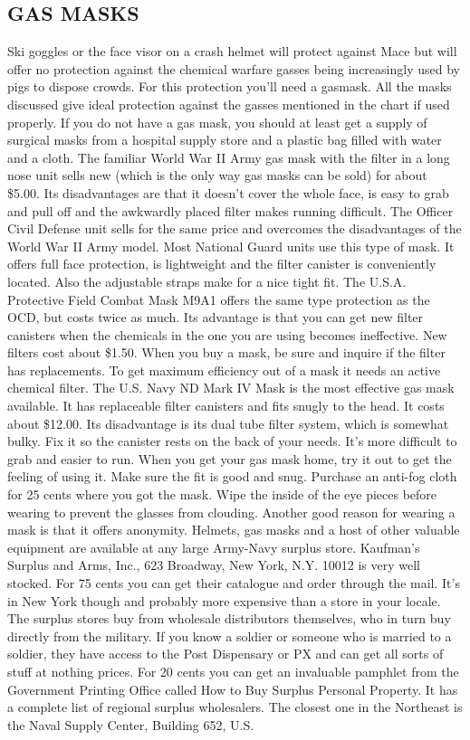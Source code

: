 \documentclass[11pt,twoside,a4paper]{book}
\begin{document}
\subsection{GAS MASKS}

Ski goggles or the face visor on a crash helmet will protect against Mace but will offer no protection against the chemical warfare gasses being increasingly used by pigs to dispose crowds. For this protection you'll need a gasmask. All the masks discussed give ideal protection against the gasses mentioned in the chart if used properly. If you do not have a gas mask, you should at least get a supply of surgical masks from a hospital supply store and a plastic bag filled with water and a cloth. The familiar World War II Army gas mask with the filter in a long nose unit sells new (which is the only way gas masks can be sold) for about \$5.00. Its disadvantages are that it doesn't cover the whole face, is easy to grab and pull off and the awkwardly placed filter makes running difficult. The Officer Civil Defense unit sells for the same price and overcomes the disadvantages of the World War II Army model. Most National Guard units use this type of mask. It offers full face protection, is lightweight and the filter canister is conveniently located. Also the adjustable straps make for a nice tight fit. The U.S.A. Protective Field Combat Mask M9A1 offers the same type protection as the OCD, but costs twice as much. Its advantage is that you can get new filter canisters when the chemicals in the one you are using becomes ineffective. New filters cost about \$1.50. When you buy a mask, be sure and inquire if the filter has replacements. To get maximum efficiency out of a mask it needs an active chemical filter. The U.S. Navy ND Mark IV Mask is the most effective gas mask available. It has replaceable filter canisters and fits snugly to the head. It costs about \$12.00. Its disadvantage is its dual tube filter system, which is somewhat bulky. Fix it so the canister rests on the back of your needs. It's more difficult to grab and easier to run. When you get your gas mask home, try it out to get the feeling of using it. Make sure the fit is good and snug. Purchase an anti-fog cloth for 25 cents where you got the mask. Wipe the inside of the eye pieces before wearing to prevent the glasses from clouding. Another good reason for wearing a mask is that it offers anonymity. Helmets, gas masks and a host of other valuable equipment are available at any large Army-Navy surplus store. Kaufman's Surplus and Arms, Inc., 623 Broadway, New York, N.Y. 10012 is very well stocked. For 75 cents you can get their catalogue and order through the mail. It's in New York though and probably more expensive than a store in your locale. The surplus stores buy from wholesale distributors themselves, who in turn buy directly from the military. If you know a soldier or someone who is married to a soldier, they have access to the Post Dispensary or PX and can get all sorts of stuff at nothing prices. For 20 cents you can get an  invaluable pamphlet from the Government Printing Office called How to Buy Surplus Personal Property. It has a complete list of regional surplus wholesalers. The closest one in the Northeast is the Naval Supply Center, Building 652, U.S. 
\end{document}
